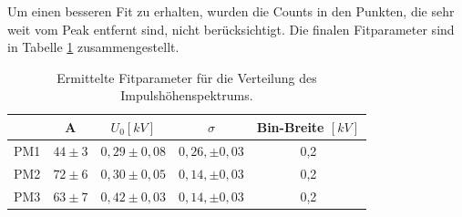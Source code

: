             Um einen besseren Fit zu erhalten, wurden die Counts in den Punkten, die sehr weit vom Peak entfernt sind, nicht berücksichtigt. Die finalen Fitparameter sind in Tabelle \ref{tab:fitparams} zusammengestellt.
            \begin{table}[ht]
            	\centering
                \begin{tabular}{c|c|c|c|c}
                	& A & $U_0 [\unit{kV}]$ & $\sigma$ & Bin-Breite $[\unit{kV}]$\\
                	\hline     PM1& $44\pm3$ & $0,29\pm0,08$ & $0,26,\pm0,03$& 0,2\\
                   			   PM2& $72\pm6$ & $0,30\pm0,05$ & $0,14,\pm0,03$& 0,2\\
                               PM3& $63\pm7$ & $0,42\pm0,03$ & $0,14,\pm0,03$& 0,2
                \end{tabular}
                \caption{Ermittelte Fitparameter für die Verteilung des Impulshöhenspektrums.}
                \label{tab:fitparams}	
            \end{table}
